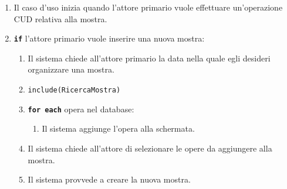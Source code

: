 \documentclass{article}
\begin{document}
		\begin{enumerate}[itemsep=8pt,parsep=0pt]
		
		\item 
		Il caso d'uso inizia quando l'attore primario vuole effettuare un’operazione CUD relativa alla mostra.



		\item \texttt{\textbf{if}} l'attore primario vuole inserire una nuova mostra:
			\begin{enumerate}	[leftmargin=28pt]
				\item Il sistema chiede all'attore primario la data nella quale egli desideri organizzare una mostra.
			    \item  \texttt{{include(RicercaMostra)}}
			    \item \texttt{\textbf{for each}} opera nel database:
			    \begin{enumerate}	[leftmargin=28pt]
					\item Il sistema aggiunge l'opera alla schermata.
                \end{enumerate}
				\item Il sistema chiede all'attore di selezionare le opere da aggiungere alla mostra.
				
			    \item  Il sistema provvede a creare la nuova mostra.
			
  			\end{enumerate}	




\end{enumerate}
\end{document}

